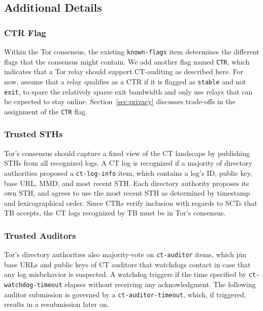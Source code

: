 \subsection{Additional Details} \label{sec:base:consensus}

\subsubsection{CTR Flag} \label{sec:base:consensus:ctr-flag} Within the Tor
consensus, the existing \texttt{known-flags} item determines the different flags
that the consensus might contain.  We add another flag named \texttt{CTR}, which
indicates that a Tor relay should support CT-auditing as described here. For
now, assume that a relay qualifies as a CTR if it is flagged as \texttt{stable}
and not \texttt{exit}, to spare the relatively sparse exit bandwidth and only
use relays that can be expected to stay online. Section~\ref{sec:privacy}
discusses trade-offs in the assignment of the \texttt{CTR} flag.

\subsubsection{Trusted STHs}
Tor's consensus should capture a fixed view of the CT landscape by publishing
STHs from all recognized logs.  A CT log is recognized if a majority of
directory authorities proposed a \texttt{ct-log-info} item, which contains a
log's ID, public key, base URL, MMD, and most recent STH\@.  Each directory
authority proposes its own STH, and agrees to use the most recent STH as
determined by timestamp and lexicographical order.  Since CTRs verify inclusion
with regards to SCTs that TB accepts, the CT logs recognized by TB must be in
Tor's consensus.

\subsubsection{Trusted Auditors}
Tor's directory authorities also majority-vote on \texttt{ct-auditor} items,
which pin base URLs and public keys of CT auditors that watchdogs contact in
case that any log misbehavior is suspected.  A watchdog triggers if the time
specified by \texttt{ct-watchdog-timeout} elapses without receiving any
acknowledgment.  The following auditor submission is governed by a
\texttt{ct-auditor-timeout}, which, if triggered, results in a resubmission
later on.

